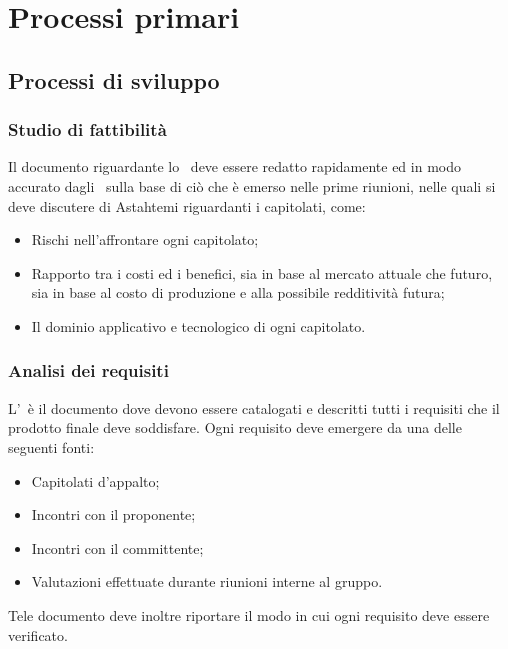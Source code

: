 \documentclass[a4paper,12pt]{article}
\begin{document}
\section{Processi primari}
	\subsection{Processi di sviluppo}
		\subsubsection{Studio di fattibilità}
		Il documento riguardante lo \studiodifattibilita\ deve essere redatto rapidamente ed in modo accurato dagli \analisti\ sulla base di ciò che è emerso nelle prime riunioni, nelle quali si deve discutere di \gls{Astah}\g temi riguardanti i capitolati, come:
		\begin{itemize}
			\item Rischi nell'affrontare ogni capitolato;
			\item Rapporto tra i costi ed i benefici, sia in base al mercato attuale che futuro, sia in base al costo di produzione e alla possibile redditività futura;
			\item Il dominio applicativo e tecnologico di ogni capitolato.
		\end{itemize}
		\subsubsection{Analisi dei requisiti}
		L'\analisideirequisiti\ è il documento dove devono essere catalogati e descritti tutti i requisiti che il prodotto finale deve soddisfare. Ogni requisito deve emergere da una delle seguenti fonti:
		\begin{itemize}
			\item Capitolati d'appalto;
			\item Incontri con il proponente;
			\item Incontri con il committente;
			\item Valutazioni effettuate durante riunioni interne al gruppo.
		\end{itemize}
		Tele documento deve inoltre riportare il modo in cui ogni requisito deve essere verificato.
\end{document}
